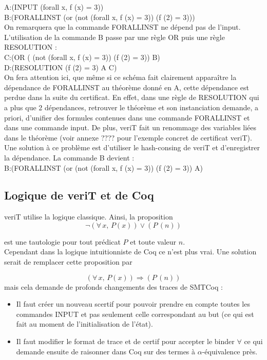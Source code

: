 \documentclass[11pt]{article}
\begin{document}
A:(INPUT (forall x, f (x) = 3)) \\
B:(FORALLINST (or (not (forall x, f (x) = 3)) (f (2) = 3))) \\

On remarquera que la commande FORALLINST ne dépend pas de l'input. L'utilisation de la commande B passe par une règle OR puis une règle RESOLUTION : \\ 

C:(OR ( (not (forall x, f (x) = 3)) (f (2) = 3)) B) \\ 
D:(RESOLUTION (f (2) = 3) A C) \\ 

On fera attention ici, que même si ce schéma fait clairement apparaître la dépendance de FORALLINST au théorème donné en A, cette dépendance est perdue dans la suite du certificat. En effet, dans une règle de RESOLUTION qui a plus que 2 dépendances, retrouver le théorème et son instanciation demande, a priori, d'unifier des formules contenues dans une commande FORALLINST et dans une commande input. De plus, veriT fait un renommage des variables liées dans le théorème (voir annexe ???? pour l'exemple concret de certificat veriT). Une solution à ce problème est d'utiliser le hash-consing de veriT et d'enregistrer la dépendance. La commande B devient : \\

B:(FORALLINST (or (not (forall x, f (x) = 3)) (f (2) = 3)) A) 

\subsection{Logique de veriT et de Coq}
veriT utilise la logique classique. Ainsi, la proposition 
\[  \neg (\forall \, x, \, P(x)) \vee (P \, (n)) \]

est une tautologie pour tout prédicat $P$ et toute valeur $n$. \\

Cependant dans la logique intuitionniste de Coq ce n'est plus vrai. Une solution serait de remplacer cette proposition par 

\[   (\forall \, x, \, P(x)) \Rightarrow (P \, (n)) \]
mais cela demande de profonds changements des traces de SMTCoq : 
\begin{itemize}

\item Il faut créer un nouveau scertif pour pouvoir prendre en compte toutes les commandes INPUT et pas seulement celle correspondant au but (ce qui est fait au moment de l'initialisation de l'état).
\item Il faut modifier le format de trace et de certif pour accepter le binder $\forall$ ce qui demande ensuite de raisonner dans Coq sur des termes à $\alpha$-équivalence près.
\end{itemize}
\end{document}
